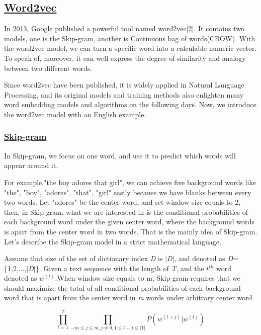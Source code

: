 \documentclass[10pt, conference, compsocconf]{IEEEtran}
\begin{document}
\subsection{\underline{Word2vec}}

In 2013, Google published a powerful tool named word2vec[\hyperref[ref 2]{2}]. It contains two models, one is the Skip-gram, another is Continuous bag of words(CBOW). With the word2vec model, we can turn a specific word into a calculable numeric vector. To speak of, moreover, it can well express the degree of similarity and analogy between two different words.

Since word2vec have been published, it is widely applied in Natural Language Processing, and its original models and training methods also enlighten many word embedding models and algorithms on the following days. Now, we introduce the word2vec model with an English example.

\subsubsection{\underline{Skip-gram}}
In Skip-gram, we focus on one word, and use it to predict which words will appear around it.

For example,"the boy adores that girl", we can achieve five background words like "the", "boy", "adores", "that", "girl" easily because we have blanks between every two words. Let "adores" be the center word, and set window size equals to 2, then, in Skip-gram, what we are interested in is the conditional probabilities of each background word under the given center word, where the background words is apart from the center word in two words. That is the mainly idea of Skip-gram. Let's describe the Skip-gram model in a strict mathematical language.

Assume that size of the set of dictionary index \textit{D} is $\big|$\textit{D}$\big|$, and denoted as \textit{D}=\{1,2,...,$\big|$\textit{D}$\big|$\}. Given a text sequence with the length of \textit{T}, and the $t^{th}$ word denoted as $w^{(t)}$.When window size equals to m, Skip-gram requires that we should maximize the total of all conditional probabilities of each background word that is apart from the center word in \textit{m} words under arbitrary center word.

\begin{equation}
\prod_{t=1}^{T}\prod_{-m \leq j \leq m, j\neq 0, 1\leq t+j \leq \big|T\big|}P(w^{(t+j)}\big|w^{(t)})
\end{equation}
\end{document}
